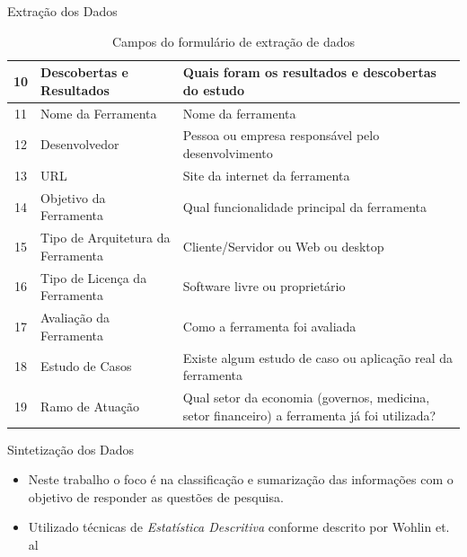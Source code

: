\documentclass[t,14pt,mathserif]{beamer}
\begin{document}
\begin{frame}{Extração dos Dados}
\begin{table}[ht]
{\begin{tabular}{|c|l|l|}
10          & Descobertas e Resultados               & Quais foram os resultados e descobertas do estudo                                            \\ \hline
11          & Nome da Ferramenta                     & Nome da ferramenta                                                                           \\ \hline
12          & Desenvolvedor                          & Pessoa ou empresa responsável pelo desenvolvimento                                           \\ \hline
13          & URL                                    & Site da internet da ferramenta                                                               \\ \hline
14          & Objetivo da Ferramenta                 & Qual funcionalidade principal da ferramenta                                                  \\ \hline
15          & Tipo de Arquitetura da Ferramenta      & Cliente/Servidor ou Web ou desktop                                                           \\ \hline
16          & Tipo de Licença da Ferramenta          & Software livre ou proprietário                                                               \\ \hline
17          & Avaliação da Ferramenta                & Como a ferramenta foi avaliada                                                               \\ \hline
18          & Estudo de Casos                        & Existe algum estudo de caso ou aplicação real da ferramenta                                  \\ \hline
19          & Ramo de Atuação                          & Qual setor da economia (governos, medicina, setor financeiro) a ferramenta já foi utilizada? \\ \hline
\end{tabular}
}
\caption{Campos do formulário de extração de dados}
\label{tab:campos-form}
\end{table}

\end{frame}

\begin{frame}{Sintetização dos Dados}
    \begin{itemize}
       \item Neste trabalho o foco é na classificação e sumarização das
informações com o objetivo de responder as questões de pesquisa.
       \item Utilizado técnicas de \textit{Estatística Descritiva} conforme
         descrito por Wohlin et. al\cite{wohlin2012experimentation}
    \end{itemize}
\end{frame}
\end{document}
